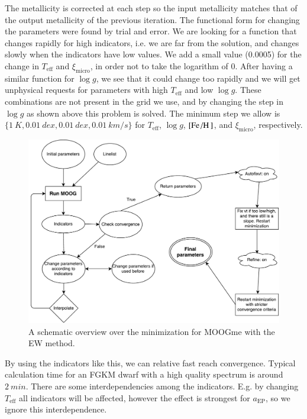 \documentclass{aa}
\begin{document}
The metallicity is corrected at each step so the input metallicity matches
that of the output metallicity of the previous iteration. The functional
form for changing the parameters were found by trial and error. We are looking
for a function that changes rapidly for high indicators, i.e. we are far from
the solution, and changes slowly when the indicators have low values. We add
a small value (0.0005) for the change in $T_\mathrm{eff}$ and $\xi_\mathrm{micro}$,
in order not to take the logarithm of 0. After having a similar
function for $\log g$, we see that it could change too rapidly and we will
get unphysical requests for parameters with high $T_\mathrm{eff}$ and low
$\log g$. These combinations are not present in the grid we use, and by
changing the step in $\log g$ as shown above this problem is solved. The
minimum step we allow is $\{\SI{1}{K}, \SI{0.01}{dex}, \SI{0.01}{dex},
\SI{0.01}{km/s}\}$ for $T_\mathrm{eff}$, $\log g$, $[\ion{Fe}/\ion{H}]$, and
$\xi_\mathrm{micro}$, respectively.

\begin{figure}[tpb]
    \centering
    \includegraphics[width=1.0\linewidth]{figures/MOOGme_minimization.pdf}
    \caption{A schematic overview over the minimization for MOOGme with the
    EW method.}
    \label{fig:MOOGme_minimization}
\end{figure}

By using the indicators like this, we can relative fast reach convergence.
Typical calculation time for an FGKM dwarf with a high quality spectrum
is around $\SI{2}{min}$.
There are some interdependencies among the indicators. E.g. by changing
$T_\mathrm{eff}$ all indicators will be affected, however the effect is
strongest for $a_\mathrm{EP}$, so we ignore this interdependence.
\end{document}
